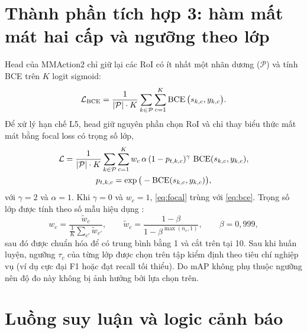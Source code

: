 \section{Thành phần tích hợp 3: hàm mất mát hai cấp và ngưỡng theo lớp}
\label{sec:loss}

Head  của MMAction2 chỉ giữ lại các RoI có ít nhất một nhãn dương ($\mathcal{P}$) và tính BCE trên $K$ logit sigmoid:
\begin{equation}
\mathcal{L}_{\text{BCE}} = \frac{1}{|\mathcal{P}| \cdot K} \sum_{k \in \mathcal{P}} \sum_{c=1}^{K}
  \operatorname{BCE}\big(s_{k,c}, y_{k,c}\big).
\label{eq:bce}
\end{equation}
Để xử lý hạn chế L5, head  giữ nguyên phần chọn RoI và chỉ thay biểu thức mất mát bằng focal loss có trọng số lớp,
\begin{equation}
\begin{gathered}
\mathcal{L} = \frac{1}{|\mathcal{P}| \cdot K} \sum_{k \in \mathcal{P}} \sum_{c=1}^{K}
  w_c\, \alpha\, (1 - p_{t,k,c})^{\gamma}\, \operatorname{BCE}(s_{k,c}, y_{k,c}),\\
p_{t,k,c} = \exp\big(-\operatorname{BCE}(s_{k,c}, y_{k,c})\big),
\end{gathered}
\label{eq:focal}
\end{equation}
với $\gamma = 2$ và $\alpha = 1$. Khi $\gamma = 0$ và $w_c = 1$, \cref{eq:focal} trùng với \cref{eq:bce}. Trọng số lớp được tính theo số mẫu hiệu dụng \cite{cui2019classbalanced}:
\begin{equation}
w_c = \frac{\tilde{w}_c}{\frac{1}{K}\sum_{c'} \tilde{w}_{c'}}, \qquad
\tilde{w}_c = \frac{1 - \beta}{1 - \beta^{\max(n_c, 1)}}, \qquad \beta = 0{,}999,
\label{eq:classweight}
\end{equation}
sau đó được chuẩn hóa để có trung bình bằng 1 và cắt trên tại 10. Sau khi huấn luyện, ngưỡng $\tau_c$ của từng lớp được chọn trên tập kiểm định theo tiêu chí nghiệp vụ (ví dụ cực đại F1 hoặc đạt recall tối thiểu). Do mAP không phụ thuộc ngưỡng nên độ đo này không bị ảnh hưởng bởi lựa chọn trên.

\section{Luồng suy luận và logic cảnh báo}
\label{sec:inference}

